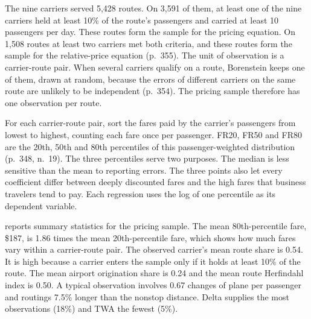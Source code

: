 The nine carriers served 5,428 routes. On 3,591 of them, at least one of the nine carriers held at least 10\%
of the route's passengers and carried at least 10 passengers per day. These routes form the sample for the
pricing equation. On 1,508 routes at least two carriers met both criteria, and these routes form the sample
for the relative-price equation (p.~355). The unit of observation is a carrier-route pair. When several
carriers qualify on a route, Borenstein keeps one of them, drawn at random, because the errors of different
carriers on the same route are unlikely to be independent (p.~354). The pricing sample therefore has one
observation per route.

 For each carrier-route pair, sort the fares paid by the carrier's passengers
from lowest to highest, counting each fare once per passenger. FR20, FR50 and FR80 are the 20th, 50th and 80th
percentiles of this passenger-weighted distribution (p.~348, n.~19). The three percentiles serve two purposes.
The median is less sensitive than the mean to reporting errors. The three points also let every coefficient
differ between deeply discounted fares and the high fares that business travelers tend to pay. Each regression
uses the log of one percentile as its dependent variable.

 reports summary statistics for the pricing sample. The mean 80th-percentile fare, \$187,
is 1.86 times the mean 20th-percentile fare, which shows how much fares vary within a carrier-route pair. The
observed carrier's mean route share is 0.54. It is high because a carrier enters the sample only if it holds at
least 10\% of the route. The mean airport origination share is 0.24 and the mean route Herfindahl index is
0.50. A typical observation involves 0.67 changes of plane per passenger and routings 7.5\% longer than the
nonstop distance. Delta supplies the most observations (18\%) and TWA the fewest (5\%).


